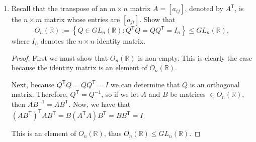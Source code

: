 \documentclass[a4paper]{article}
\newcommand{\tr}{\mathsf{T}}									%
\begin{document}
\begin{enumerate}[leftmargin=.5in,label=(\textbf{\arabic*})]
\begin{enumerate}[leftmargin=*, label=(\textbf{\alph*})]
\begin{proof}

First it is necessary to prove that $\mathbb{Q}(\sqrt{2})$ is non-empty.  This is clearly the case because if you plug any rational numbers, $a$ and $b$, into the expression $a + \sqrt{2}b$, it will return a result.  Second, if we let $p,q \in \mathbb{Q}(\sqrt{2})$, then $p = a + \sqrt{2}b$ and $q = c + \sqrt{2}d$.  Then $(a + \sqrt{2}b)/(c + \sqrt{2}d) \in \mathbb{Q}(\sqrt{2}) \leq \mathbb{R}$.  

\end{proof}

\item $\mathbb{Q}(\sqrt{2})^\times \leq \mathbb{R}^\times$.

\begin{proof}

Again, it can easily be determined that $\mathbb{Q}(\sqrt{2})^\times$ is non-empty by simply entering in rational numbers for $a$ and $b$.  Also, we will again use $p,q \in \mathbb{Q}(\sqrt{2})^\times$, then $p = a + \sqrt{2}b$ and $q = c + \sqrt{2}d$.  The inverse of $q$ can be defined as $\frac{1}{(c + \sqrt{2}d)} = \frac{1}{(c + \sqrt{2}d)} \cdot \frac{(c - \sqrt{2}d)}{(c - \sqrt{2}d)} = \frac{(c - \sqrt{2}d)}{(c^2-2d^2)}$.  Then by taking the product of $x$ and $y^{-1}$, we get $$\frac{ac-\sqrt{2}ad}{c^2-2d^2}+\sqrt{2} \times (\frac{bc-\sqrt{2}db}{c^2-2d^2})$$ which is clearly an element of $\mathbb{Q}(\sqrt{2})^\times$.  

\end{proof}

\end{enumerate}

\item Recall that the transpose of an $m \times n$ matrix $A = [a_{ij}]$, denoted by $A^\tr$,  is the $n \times m$ matrix whose entries are $[a_{ji}]$. Show that 
\[ O_n (\mathbb{R}):= \left\{ Q \in GL_n (\mathbb{R}) : Q^\tr Q = Q Q^\tr = I_n \right\} \leq GL_n (\mathbb{R}), \]
where $I_n$ denotes the $n \times n$ identity matrix.

\begin{proof}

First we must show that $O_n (\mathbb{R})$ is non-empty.  This is clearly the case because the identity matrix is an element of $O_n (\mathbb{R})$.  

Next, because $Q^\tr Q = Q Q^\tr = I$ we can determine that $Q$ is an orthogonal matrix.  Therefore, $Q^\tr=Q^{-1}$, so if we let $A$ and $B$ be matrices $\in O_n (\mathbb{R})$, then $AB^{-1}=AB^\tr$.  Now, we have that $(AB^\tr)^\tr AB^\tr = B(A^\tr A)B^\tr = BB^\tr = I$.  

This is an element of $O_n (\mathbb{R})$, thus $O_n (\mathbb{R}) \leq GL_n (\mathbb{R})$.  

\end{proof}






\end{enumerate}
\end{document}

